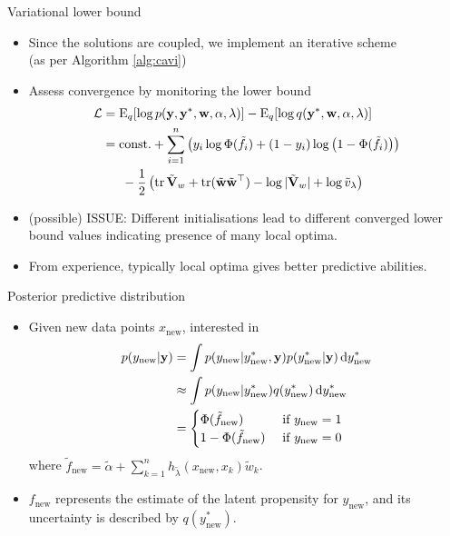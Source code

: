 \begin{frame}{Variational lower bound}
  \begin{itemize}\setlength\itemsep{1em}
    \item Since the solutions are coupled, we implement an iterative scheme \\ (as per Algorithm \ref{alg:cavi})
    \item Assess convergence by monitoring the lower bound
    \begin{align*}
      {\mathcal L} 
      &= \operatorname{E}_q[\log p({\mathbf y},{\mathbf y}^*,{\mathbf w},\alpha,\lambda)] - \operatorname{E}_q[\log q({\mathbf y}^*,{\mathbf w},\alpha,\lambda)] \\
      &= \text{const.} + \sum_{i=1}^n \left(y_i \log \Phi(\tilde f_i) + (1-y_i) \log \big(1 - \Phi(\tilde f_i)\big)\right) \\
      &\phantom{==}-\frac{1}{2} \left( \operatorname{tr}\tilde{{\mathbf V}}_w + \operatorname{tr} (\tilde{{\mathbf w}}\tilde{{\mathbf w}}^\top) - \log \vert \tilde{{\mathbf V}}_w \vert + \log \tilde v_\lambda \right) 
    \end{align*}
    \item (possible) ISSUE: Different initialisations lead to different converged lower bound values indicating presence of many local optima.
    \item From experience, typically local optima gives better predictive abilities.
  \end{itemize}
\end{frame}

\begin{frame}{Posterior predictive distribution}
  \begin{itemize}\setlength\itemsep{1em}
    \item Given new data points $x_{\text{new}}$, interested in
    \begin{align*}
      p(y_{\text{new}}|{\mathbf y}) &= \int p(y_{\text{new}} | y^*_{\text{new}}, {\mathbf y}) p (y^*_{\text{new}} | {\mathbf y}) \, \text{d} y^*_{\text{new}} \\
      &\approx \int p(y_{\text{new}} | y^*_{\text{new}}) q (y^*_{\text{new}}) \, \text{d} y^*_{\text{new}} \\
      &= \begin{cases}
        \Phi(\tilde f_{\text{new}}) & \text{ if } y_{\text{new}} = 1 \\
        1 - \Phi(\tilde f_{\text{new}}) & \text{ if } y_{\text{new}} = 0 \\
      \end{cases}
    \end{align*}
    where $\tilde f_{\text{new}} = \tilde\alpha + {\sum_{k=1}^n} h_{\tilde\lambda}(x_{\text{new}}, x_k)\tilde w_k$.
    \item $f_{\text{new}}$ represents the estimate of the latent propensity for $y_{\text{new}}$, and its uncertainty is described by $q(y_{\text{new}}^*)$.
  \end{itemize}
\end{frame}
